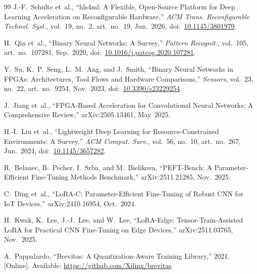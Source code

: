 \documentclass[conference]{IEEEtran}
\begin{document}
\begin{thebibliography}{99}
J.-F.~Schulte et~al.,
``hls4ml: A Flexible, Open-Source Platform for Deep Learning Acceleration on Reconfigurable Hardware,''
\emph{ACM Trans. Reconfigurable Technol. Syst.}, vol.~19, no.~2, art.~no.~19, Jun.~2026,
doi:~\url{10.1145/3801979}.


H.~Qin et~al.,
``Binary Neural Networks: A Survey,''
\emph{Pattern Recognit.}, vol.~105, art.~no.~107281, Sep.~2020,
doi:~\url{10.1016/j.patcog.2020.107281}.


Y.~Su, K.~P.~Seng, L.~M.~Ang, and J.~Smith,
``Binary Neural Networks in FPGAs: Architectures, Tool Flows and Hardware Comparisons,''
\emph{Sensors}, vol.~23, no.~22, art.~no.~9254, Nov.~2023,
doi:~\url{10.3390/s23229254}.

J.~Jiang et~al.,
``FPGA-Based Acceleration for Convolutional Neural Networks: A Comprehensive Review,''
arXiv:2505.13461, May~2025.

H.-I.~Liu et~al.,
``Lightweight Deep Learning for Resource-Constrained Environments: A Survey,''
\emph{ACM Comput. Surv.}, vol.~56, no.~10, art.~no.~267, Jun.~2024,
doi:~\url{10.1145/3657282}.

R.~Belanec, B.~Pecher, I.~Srba, and M.~Bielikova,
``PEFT-Bench: A Parameter-Efficient Fine-Tuning Methods Benchmark,''
arXiv:2511.21285, Nov.~2025.

C.~Ding et~al.,
``LoRA-C: Parameter-Efficient Fine-Tuning of Robust CNN for IoT Devices,''
arXiv:2410.16954, Oct.~2024.

H.~Kwak, K.~Lee, J.-J.~Lee, and W.~Lee,
``LoRA-Edge: Tensor-Train-Assisted LoRA for Practical CNN Fine-Tuning on Edge Devices,''
arXiv:2511.03765, Nov.~2025.

A.~Pappalardo,
``Brevitas: A Quantization-Aware Training Library,''
2021. [Online]. Available: \url{https://github.com/Xilinx/brevitas}

\end{thebibliography}
\end{document}
